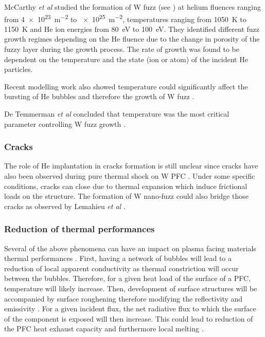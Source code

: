 McCarthy \textit{et al} studied the formation of W \gls{fuzz} (see ) at helium fluences ranging from \SI{4e23}{m^{-2}} to \SI{e25}{m^{-2}}, temperatures ranging from \SI{1050}{K} to \SI{1150}{K} and He ion energies from \SI{80}{eV} to \SI{100}{eV}.
They identified different \gls{fuzz} growth regimes depending on the He \gls{fluence} due to the change in porosity of the fuzzy layer during the growth process.
The rate of growth was found to be dependent on the temperature and the state (ion or atom) of the incident He particles.

Recent modelling work also showed temperature could significantly affect the bursting of He bubbles and therefore the growth of W \gls{fuzz} .

De Temmerman \textit{et al} concluded that temperature was the most critical parameter controlling W \gls{fuzz} growth .

\subsubsection{Cracks}

The role of He implantation in cracks formation is still unclear since cracks have also been observed during pure thermal shock on W PFC .
Under some specific conditions, cracks can close due to thermal expansion which induce frictional loads on the structure.
The formation of W nano-fuzz could also bridge those cracks as observed by Lemahieu \textit{et al} .

\subsubsection{Reduction of thermal performances}

Several of the above phenomena can have an impact on \gls{plasma} facing materials thermal performances .
First, having a network of bubbles will lead to a reduction of local apparent conductivity as thermal constriction will occur between the bubbles.
Therefore, for a given heat load of the surface of a PFC, temperature will likely increase.
Then, development of surface structures will be accompanied by surface roughening therefore modifying the reflectivity and emissivity .
For a given incident flux, the net radiative flux to which the surface of the component is exposed will then increase.
This could lead to reduction of the PFC heat exhaust capacity and furthermore local melting .

